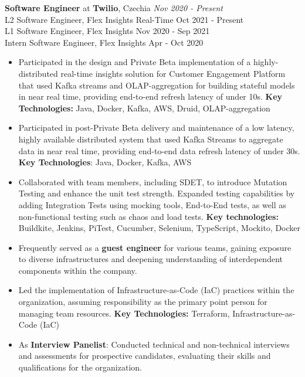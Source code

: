 
{\textbf{Software Engineer} at \textbf{Twilio}, Czechia} 
    \hfill {\em Nov 2020 - Present}\\
    {L2 Software Engineer, Flex Insights Real-Time} \hfill  {Oct 2021 - Present}\\
    {L1 Software Engineer, Flex Insights} \hfill            {Nov 2020 - Sep 2021}\\
    {Intern Software Engineer, Flex Insights} \hfill        {Apr - Oct 2020}
    \begin{itemize}
        \item Participated in the design and Private Beta implementation of a highly-distributed real-time insights solution for Customer Engagement Platform that used Kafka streams and OLAP-aggregation for building stateful models in near real time, providing end-to-end refresh latency of under 10s. \textbf{Key Technologies:} Java, Docker, Kafka, AWS, Druid, OLAP-aggregation
        \item Participated in post-Private Beta delivery and maintenance of a low latency, highly available distributed system that used Kafka Streams to aggregate data in near real time, providing end-to-end data refresh latency of under 30s. \textbf{Key Technologies}: Java, Docker, Kafka, AWS
        \item Collaborated with team members, including SDET, to introduce Mutation Testing and enhance the unit test strength. Expanded testing capabilities by adding Integration Tests using mocking tools, End-to-End tests, as well as non-functional testing such as chaos and load tests. \textbf{Key technologies:} Buildkite, Jenkins, PiTest, Cucumber, Selenium, TypeScript, Mockito, Docker
        \item Frequently served as a \textbf{guest engineer} for various teams, gaining exposure to diverse infrastructures and deepening understanding of interdependent components within the company.
        \item Led the implementation of Infrastructure-as-Code (IaC) practices within the organization, assuming responsibility as the primary point person for managing team resources. \textbf{Key Technologies:} Terraform, Infrastructure-as-Code (IaC)
        \item As \textbf{Interview Panelist}: Conducted technical and non-technical interviews and assessments for prospective candidates, evaluating their skills and qualifications for the organization.

\end{itemize}
